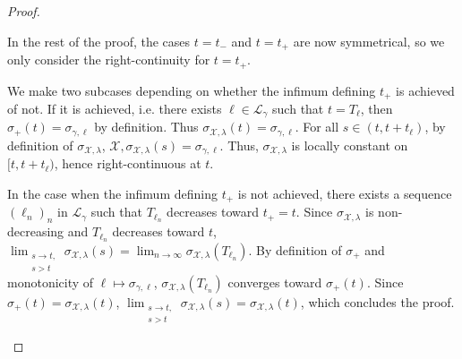 \documentclass[11pt]{article}
\begin{document}
\begin{proof}
\begin{itemize}
  In the rest of the proof, the cases $t=t_-$ and $t=t_+$ are now symmetrical, so we only consider the right-continuity for $t=t_+$.

  We make two subcases depending on whether the infimum defining $t_+$ is achieved of not. If it is achieved, i.e. there exists $\ell\in \mathcal{L}_\gamma$ such that $t=T_\ell$, then $\sigma_+(t)=\sigma_{\gamma,\ell}$ by definition. Thus
  $\sigma_{\mathcal{X},\lambda}(t)=\sigma_{\gamma,\ell}$. For all $s\in (t,t+t_\ell)$, by definition of $\sigma_{\mathcal{X},\lambda}$, $\mathcal{X},\sigma_{\mathcal{X},\lambda}(s)=\sigma_{\gamma,\ell}$. Thus, $\sigma_{\mathcal{X},\lambda}$ is locally constant on $[t,t+t_\ell)$, hence right-continuous at $t$.

  In the case when the infimum defining $t_+$ is not achieved, there exists a sequence $(\ell_n)_n$ in $\mathcal{L}_\gamma$ such that $T_{\ell_n}$ decreases toward $t_+=t$.
Since $\sigma_{\mathcal{X},\lambda}$ is non-decreasing and  $T_{\ell_n}$ decreases toward $t$, $\lim_{\substack{s\to t,\\ s>t}}  \sigma_{\mathcal{X},\lambda}(s)=\lim_{n\to \infty} \sigma_{\mathcal{X},\lambda}(T_{\ell_n})$.
By definition of $\sigma_+$ and monotonicity of $\ell\mapsto \sigma_{\gamma,\ell}$,  $\sigma_{\mathcal{X},\lambda}(T_{\ell_n})$ converges toward $\sigma_+(t)$. Since  $\sigma_+(t)=\sigma_{\mathcal{X},\lambda}(t)$,
$\lim_{\substack{s\to t,\\ s>t}}  \sigma_{\mathcal{X},\lambda}(s)=\sigma_{\mathcal{X},\lambda}(t)$, which concludes the proof.\qedhere
  \end{itemize}
\end{proof}
\end{document}
